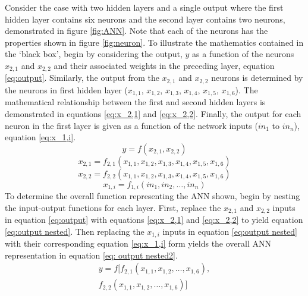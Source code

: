 Consider the case with two hidden layers and a single output where the first hidden layer contains six neurons and the second layer contains two neurons, demonstrated in figure \ref{fig:ANN}.  Note that each of the neurons has the properties shown in figure \ref{fig:neuron}. To illustrate the mathematics contained in the `black box', begin by considering the output, $y$ as a function of the neurons $x_{2,1}$ and $x_{2,2}$ and their associated weights in the preceding layer, equation \ref{eq:output}. Similarly, the output from the $x_{2,1}$ and $x_{2,2}$  neurons is determined by the neurons in first hidden layer ($x_{1,1}$, $x_{1,2}$, $x_{1,3}$, $x_{1,4}$, $x_{1,5}$, $x_{1,6}$). The mathematical relationship between the first and second hidden layers is demonstrated in equations \ref{eq:x_2,1} and \ref{eq:x_2,2}. Finally, the output for each neuron in the first layer is given as a function of the network inputs ($in_1$ to $in_n$), equation \ref{eq:x_1,i}. 
		\begin{equation}
			y = f(x_{2,1}, x_{2,2}) 
			\label{eq:output}\end{equation}
		\begin{equation}
			x_{2,1} = f_{2,1}(x_{1,1}, x_{1,2}, x_{1,3}, x_{1,4}, x_{1,5}, x_{1,6}) 
			\label{eq:x_2,1}\end{equation}
		\begin{equation}
			x_{2,2} = f_{2,2}(x_{1,1}, x_{1,2}, x_{1,3}, x_{1,4}, x_{1,5}, x_{1,6})
			\label{eq:x_2,2}\end{equation}
		\begin{equation}
			x_{1,i} = f_{1,i}(in_1, in_2, \ldots, in_n)
			\label{eq:x_1,i}\end{equation}
To determine the overall function representing the ANN shown, begin by nesting the input-output functions for each layer. First, replace the $x_{2,1}$ and $x_{2,2}$ inputs in equation \ref{eq:output} with equations \ref{eq:x_2,1} and \ref{eq:x_2,2} to yield equation \ref{eq:output nested}. Then replacing the $x_{1,i}$ inputs in equation \ref{eq:output nested} with their corresponding equation \ref{eq:x_1,i} form yields the overall ANN representation in equation \ref{eq: output nested2}.
		\begin{equation}
			\begin{split}
			y = f\big[
				f_{2,1}(x_{1,1}, x_{1,2}, \ldots, x_{1,6}), \\
				f_{2,2}(x_{1,1}, x_{1,2}, \ldots, x_{1,6}) \big]
			\end{split}
			\label{eq:output nested}
			\end{equation}
